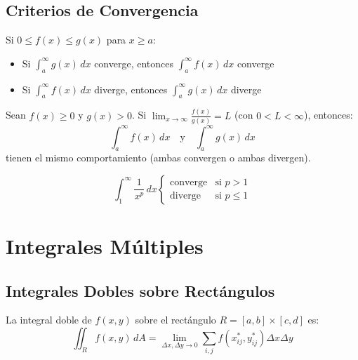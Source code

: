 \documentclass[12pt, a4paper]{book}
\begin{document}
\section{Criterios de Convergencia}

\begin{teorema}
Si $0 \leq f(x) \leq g(x)$ para $x \geq a$:
\begin{itemize}
    \item Si $\int_a^\infty g(x) \, dx$ converge, entonces $\int_a^\infty f(x) \, dx$ converge
    \item Si $\int_a^\infty f(x) \, dx$ diverge, entonces $\int_a^\infty g(x) \, dx$ diverge
\end{itemize}
\end{teorema}

\begin{teorema}
Sean $f(x) \geq 0$ y $g(x) > 0$. Si $\lim_{x \to \infty} \frac{f(x)}{g(x)} = L$ (con $0 < L < \infty$), entonces:
\[
\int_a^\infty f(x) \, dx \quad \text{y} \quad \int_a^\infty g(x) \, dx
\]
tienen el mismo comportamiento (ambas convergen o ambas divergen).
\end{teorema}

\begin{teorema}
\[
\int_1^\infty \frac{1}{x^p} \, dx \begin{cases}
\text{converge} & \text{si } p > 1 \\
\text{diverge} & \text{si } p \leq 1
\end{cases}
\]
\end{teorema}

\chapter{Integrales Múltiples}

\section{Integrales Dobles sobre Rectángulos}

\begin{definicion}
La integral doble de $f(x,y)$ sobre el rectángulo $R = [a,b] \times [c,d]$ es:
\[
\iint_R f(x,y) \, dA = \lim_{\Delta x, \Delta y \to 0} \sum_{i,j} f(x_{ij}^*, y_{ij}^*) \Delta x \Delta y
\]
\end{definicion}
\end{document}
